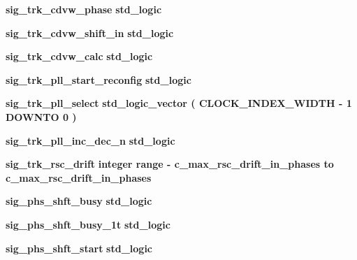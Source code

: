 \begin{DoxyCompactItemize}
\item 
{\bf sig\+\_\+trk\+\_\+cdvw\+\_\+phase} {\bfseries \textcolor{comment}{std\+\_\+logic}\textcolor{vhdlchar}{ }} 
\item 
{\bf sig\+\_\+trk\+\_\+cdvw\+\_\+shift\+\_\+in} {\bfseries \textcolor{comment}{std\+\_\+logic}\textcolor{vhdlchar}{ }} 
\item 
{\bf sig\+\_\+trk\+\_\+cdvw\+\_\+calc} {\bfseries \textcolor{comment}{std\+\_\+logic}\textcolor{vhdlchar}{ }} 
\item 
{\bf sig\+\_\+trk\+\_\+pll\+\_\+start\+\_\+reconfig} {\bfseries \textcolor{comment}{std\+\_\+logic}\textcolor{vhdlchar}{ }} 
\item 
{\bf sig\+\_\+trk\+\_\+pll\+\_\+select} {\bfseries \textcolor{comment}{std\+\_\+logic\+\_\+vector}\textcolor{vhdlchar}{ }\textcolor{vhdlchar}{(}\textcolor{vhdlchar}{ }\textcolor{vhdlchar}{ }\textcolor{vhdlchar}{ }\textcolor{vhdlchar}{ }{\bfseries {\bf C\+L\+O\+C\+K\+\_\+\+I\+N\+D\+E\+X\+\_\+\+W\+I\+D\+TH}} \textcolor{vhdlchar}{-\/}\textcolor{vhdlchar}{ } \textcolor{vhdldigit}{1} \textcolor{vhdlchar}{ }\textcolor{keywordflow}{D\+O\+W\+N\+TO}\textcolor{vhdlchar}{ }\textcolor{vhdlchar}{ } \textcolor{vhdldigit}{0} \textcolor{vhdlchar}{ }\textcolor{vhdlchar}{)}\textcolor{vhdlchar}{ }} 
\item 
{\bf sig\+\_\+trk\+\_\+pll\+\_\+inc\+\_\+dec\+\_\+n} {\bfseries \textcolor{comment}{std\+\_\+logic}\textcolor{vhdlchar}{ }} 
\item 
{\bf sig\+\_\+trk\+\_\+rsc\+\_\+drift} {\bfseries \textcolor{comment}{integer}\textcolor{vhdlchar}{ }\textcolor{vhdlchar}{ }\textcolor{vhdlchar}{ }\textcolor{keywordflow}{range}\textcolor{vhdlchar}{ }\textcolor{vhdlchar}{-\/}\textcolor{vhdlchar}{ }\textcolor{vhdlchar}{ }\textcolor{vhdlchar}{ }{\bfseries {\bf c\+\_\+max\+\_\+rsc\+\_\+drift\+\_\+in\+\_\+phases}} \textcolor{vhdlchar}{ }\textcolor{keywordflow}{to}\textcolor{vhdlchar}{ }\textcolor{vhdlchar}{ }\textcolor{vhdlchar}{ }\textcolor{vhdlchar}{ }{\bfseries {\bf c\+\_\+max\+\_\+rsc\+\_\+drift\+\_\+in\+\_\+phases}} \textcolor{vhdlchar}{ }} 
\item 
{\bf sig\+\_\+phs\+\_\+shft\+\_\+busy} {\bfseries \textcolor{comment}{std\+\_\+logic}\textcolor{vhdlchar}{ }} 
\item 
{\bf sig\+\_\+phs\+\_\+shft\+\_\+busy\+\_\+1t} {\bfseries \textcolor{comment}{std\+\_\+logic}\textcolor{vhdlchar}{ }} 
\item 
{\bf sig\+\_\+phs\+\_\+shft\+\_\+start} {\bfseries \textcolor{comment}{std\+\_\+logic}\textcolor{vhdlchar}{ }} 
\item 

\end{DoxyCompactItemize}
